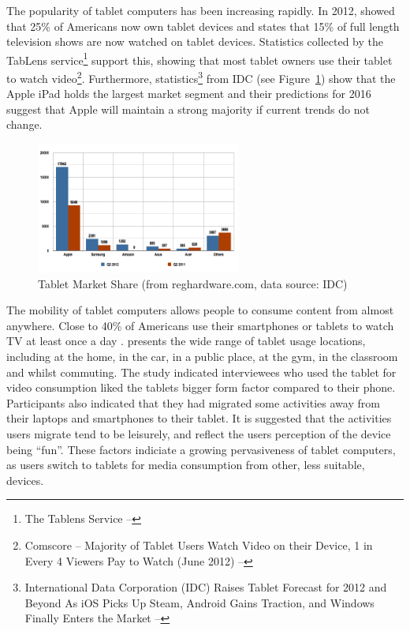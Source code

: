 	The popularity of tablet computers has been increasing rapidly. In 2012, \citet{pewResearch} showed that 25\% of Americans now own tablet devices and \citet{viacom} states that 15\% of full length television shows are now watched on tablet devices. Statistics collected by the TabLens service\footnote{The Tablens Service -- } support this, showing that most tablet owners use their tablet to watch video\footnote{Comscore -- Majority of Tablet Users Watch Video on their Device, 1 in Every 4 Viewers Pay to Watch (June 2012) -- }. Furthermore, statistics\footnote{International Data Corporation (IDC) Raises Tablet Forecast for 2012 and Beyond As iOS Picks Up Steam, Android Gains Traction, and Windows Finally Enters the Market -- } from IDC (see Figure~\ref{fig:tablet_market_share}) show that the Apple iPad holds the largest market segment and their predictions for 2016 suggest that Apple will maintain a strong majority if current trends do not change.

	\begin{figure}[h]
		\centering
			\includegraphics[width=0.6\textwidth]{images/idcTabletMarketShare.png}
		\caption[Caption for LOF]{Tablet Market Share (from reghardware.com\footnotemark, data source: IDC)}
		\label{fig:tablet_market_share}
	\end{figure}

	The mobility of tablet computers allows people to consume content from almost anywhere. Close to 40\% of Americans use their smartphones or tablets to watch TV at least once a day \citep{state-of-media}. \citet{google-tablets} presents the wide range of tablet usage locations, including at the home, in the car, in a public place, at the gym, in the classroom and whilst commuting. The study indicated interviewees who used the tablet for video consumption liked the tablets bigger form factor compared to their phone. Participants also indicated that they had migrated some activities away from their laptops and smartphones to their tablet. It is suggested that the activities users migrate tend to be leisurely, and reflect the users perception of the device being ``fun''. These factors indiciate a growing pervasiveness of tablet computers, as users switch to tablets for media consumption from other, less suitable, devices.

